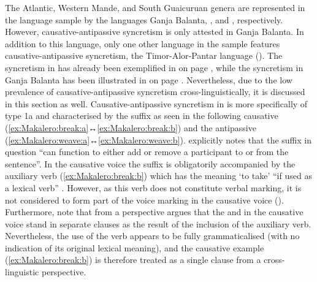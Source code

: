 The Atlantic, Western Mande, and South Guaicuruan genera are represented in the language sample by the languages Ganja Balanta, , and , respectively. However, causative-antipassive syncretism is only attested in Ganja Balanta. In addition to this language, only one other language in the sample features causative-antipassive syncretism, the Timor-Alor-Pantar language  (). The syncretism in  has already been exemplified in  on page \pageref{tab:ch3:type1a-examples-1}, while the syncretism in Ganja Balanta has been illustrated in  on page \pageref{tab:ch3:type1b-examples-2}. Nevertheless, due to the low prevalence of causative-antipassive syncretism cross-linguistically, it is discussed in this section as well. Causative-antipassive syncretism in  is more specifically of type 1a and characterised by the suffix  as seen in the following causative  (\ref{ex:Makalero:break:a}↔\ref{ex:Makalero:break:b}) and the antipassive  (\ref{ex:Makalero:weave:a}↔\ref{ex:Makalero:weave:b}). \cite[340]{huber:2011} explicitly notes that the suffix in question “can function to either add or remove a participant to or from the sentence”. In the causative voice the suffix is obligatorily accompanied by the auxiliary verb  (\ref{ex:Makalero:break:b}) which has the meaning ‘to take’ “if used as a lexical verb” \citep[203]{huber:2011}. However, as this verb does not constitute verbal marking, it is not considered to form part of the voice marking in the causative voice (). Furthermore, note that from a  perspective \cite[340]{huber:2011} argues that the  and  in the causative voice stand in separate clauses as the result of the inclusion of the auxiliary verb. Nevertheless, the use of the verb appears to be fully grammaticalised (with no indication of its original lexical meaning), and the causative example (\ref{ex:Makalero:break:b}) is therefore treated as a single clause from a cross-linguistic perspective. 

